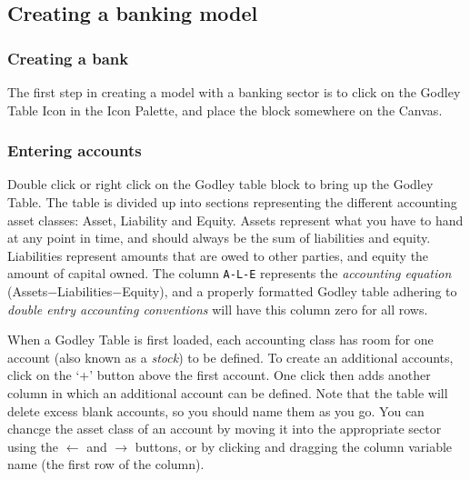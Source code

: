 \subsection{Creating a banking model}
\label{creatingBankingModel}

\subsubsection{Creating a bank}

The first step in creating a model with a banking sector is to click on the Godley Table Icon in the Icon Palette, and place the block somewhere on the Canvas.

\subsubsection{Entering accounts}

Double click or right click on the Godley table block to bring up the
Godley Table. The table is divided up into sections representing the
different accounting asset classes: Asset, Liability and
Equity. Assets represent what you have to hand at any point in time,
and should always be the sum of liabilities and equity. Liabilities
represent amounts that are owed to other parties, and equity the
amount of capital owned. The column \verb+A-L-E+ represents the {\em
  accounting equation} (Assets$-$Liabilities$-$Equity), and a properly
formatted Godley table adhering to {\em double entry accounting
  conventions} will have this column zero for all rows.

When a Godley Table is first loaded, each accounting class has room
for one account (also known as a {\em stock}) to be defined. To create
an additional accounts, click on the `+' button above the first
account. One click then adds another column in which an additional
account can be defined. Note that the table will delete excess blank
accounts, so you should name them as you go. You can chancge the asset
class of an account by moving it into the appropriate sector using the
$\leftarrow$ and $\rightarrow$ buttons, or by clicking and dragging
the column variable name (the first row of the column).


